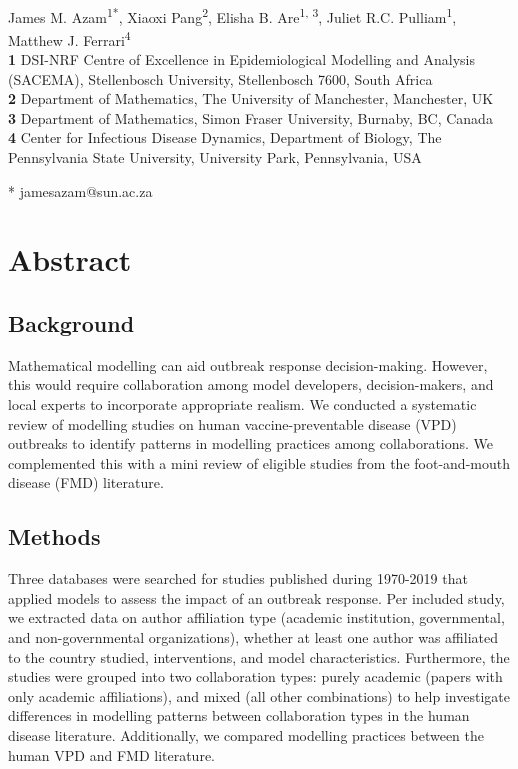 \documentclass[10pt,letterpaper]{article}
\begin{document}
\vspace*{0.2in}

\begin{flushleft}
{\Large
\textbf{}
}
\newline
\\
James M. Azam\textsuperscript{1*},
Xiaoxi Pang\textsuperscript{2},
Elisha B. Are\textsuperscript{1, 3},
Juliet R.C. Pulliam\textsuperscript{1},
Matthew J. Ferrari\textsuperscript{4}
\\
\bigskip
\textbf{1} DSI-NRF Centre of Excellence in Epidemiological Modelling and Analysis (SACEMA), Stellenbosch University, Stellenbosch 7600, South Africa
\\
\textbf{2} Department of Mathematics, The University of Manchester, Manchester, UK
\\
\textbf{3} Department of Mathematics, Simon Fraser University, Burnaby, BC, Canada
\\
\textbf{4} Center for Infectious Disease Dynamics, Department of Biology, The Pennsylvania
State University, University Park, Pennsylvania, USA
\\
\bigskip

* jamesazam@sun.ac.za

\end{flushleft}
\section*{Abstract}
\subsection*{Background}
Mathematical modelling can aid outbreak response decision-making. However, this would require collaboration among model developers, decision-makers, and local experts to incorporate appropriate realism. We conducted a systematic review of modelling studies on human vaccine-preventable disease (VPD) outbreaks to identify patterns in modelling practices among collaborations. We complemented this with a mini review of eligible studies from the foot-and-mouth disease (FMD) literature.   
\subsection*{Methods}
Three databases were searched for studies published during 1970-2019 that applied models to assess the impact of an outbreak response. Per included study, we extracted data on author affiliation type (academic institution, governmental, and non-governmental organizations), whether at least one author was affiliated to the country studied, interventions, and model characteristics. Furthermore, the studies were grouped into two collaboration types: purely academic (papers with only academic affiliations), and mixed (all other combinations) to help investigate differences in modelling patterns between collaboration types in the human disease literature. Additionally, we compared modelling practices between the human VPD and FMD literature. 
\end{document}
